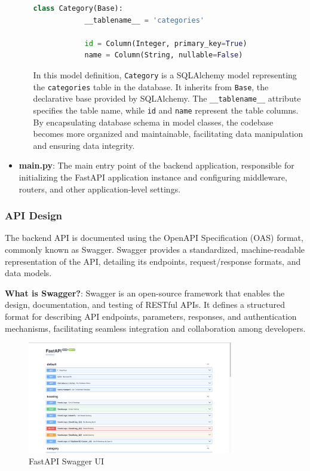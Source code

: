 \begin{itemize}
\begin{itemize}
\begin{lstlisting}[language=Python]
        class Category(Base):
            __tablename__ = 'categories'

            id = Column(Integer, primary_key=True)
            name = Column(String, nullable=False)
        \end{lstlisting}

        In this model definition, \texttt{Category} is a SQLAlchemy model representing the \texttt{categories} table in the database. It inherits from \texttt{Base}, the declarative base provided by SQLAlchemy. The \texttt{\_\_tablename\_\_} attribute specifies the table name, while \texttt{id} and \texttt{name} represent the table columns. By encapsulating database schema in model classes, the codebase becomes more organized and maintainable, facilitating data manipulation and ensuring data integrity.
    \end{itemize}

    \item \textbf{main.py}: The main entry point of the backend application, responsible for initializing the FastAPI application instance and configuring middleware, routers, and other application-level settings.
\end{itemize}

\subsubsection{API Design}

The backend API is documented using the OpenAPI Specification (OAS) format, commonly known as Swagger. Swagger provides a standardized, machine-readable representation of the API, detailing its endpoints, request/response formats, and data models.

\textbf{What is Swagger?}:
Swagger is an open-source framework that enables the design, documentation, and testing of RESTful APIs. It defines a structured format for describing API endpoints, parameters, responses, and authentication mechanisms, facilitating seamless integration and collaboration among developers.

\begin{figure}[h]
    \centering
    \includegraphics[width=0.8\textwidth]{images/swagger_ui}
    \caption{FastAPI Swagger UI}
    \label{fig:swagger_ui}
\end{figure}

